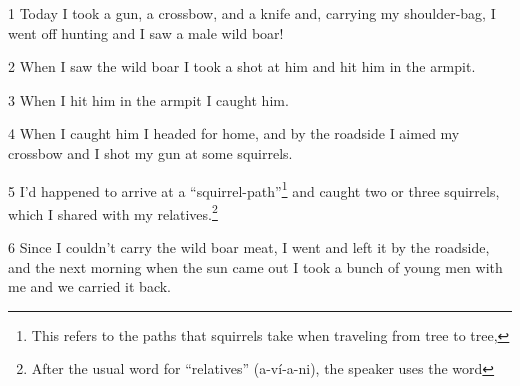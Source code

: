 
1 Today I took a gun, a crossbow, and a knife and, carrying my shoulder-bag, I
went off hunting and I saw a male wild boar!

2 When I saw the wild boar I took a shot at him and hit him in the armpit.

3 When I hit him in the armpit I caught him.

4 When I caught him I headed for home, and by the roadside I aimed my crossbow
and I shot my gun at some squirrels.

5 I'd happened to arrive at a ``squirrel-path''\footnote{This refers to the paths that squirrels take when traveling from tree to tree,} and caught two or three squirrels,
which I shared with my relatives.\footnote{After the usual word for ``relatives'' (a-ví-a-ni), the speaker uses the word}

6 Since I couldn't carry the wild boar meat, I went and left it by the roadside,
and the next morning when the sun came out I took a bunch of young men with me
and we carried it back.

